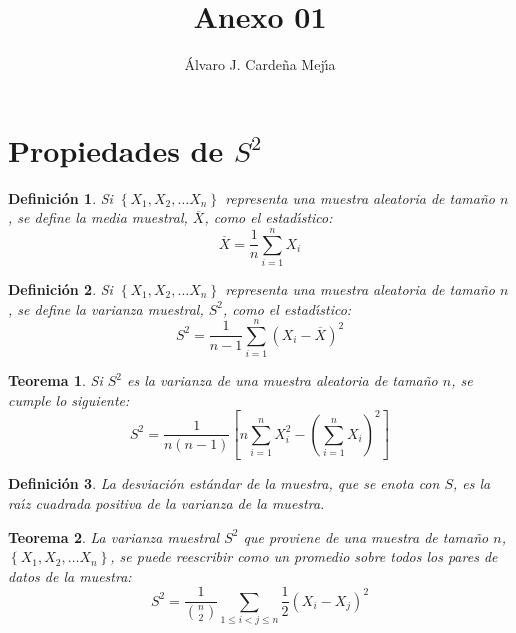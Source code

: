 \documentclass[a4paper,11pt]{article}
\title{Anexo 01}
\author{\'Alvaro J. Carde\~na Mej\'{\i}a}
\theoremstyle{teoremas}
\newtheorem{teorema}{Teorema}[section]
\theoremstyle{ejemplos}
\theoremstyle{definiciones}
\theoremstyle{lemas}
\newtheorem*{definicion}{Definici\'on}
\begin{document}
\maketitle

\section{Propiedades de $S^2$}

\begin{definicion}
 Si $\left\{ X_1, X_2, \ldots X_n \right\}$ representa una muestra aleatoria de tama\~no $n$, se define la media muestral, $\overline{X}$, como el estad\'{\i}stico:
 \begin{equation}
  \overline{X} = \frac{1}{n}\sum_{i=1}^n X_i
 \end{equation}
\end{definicion}

\begin{definicion}
 Si $\left\{ X_1, X_2, \ldots X_n \right\}$ representa una muestra aleatoria de tama\~no $n$, se define la varianza muestral, $S^2$, como el estad\'{\i}stico:
 \begin{equation*}
  S^2 = \frac{1}{n-1} \sum_{i=1}^n \left( X_i - \overline{X} \right)^2
 \end{equation*}
\end{definicion}

\begin{teorema} \label{Teorema:VarMCalculoFacil}
 Si $S^2$ es la varianza de una muestra aleatoria de tama\~no $n$, se cumple lo siguiente:
 \begin{equation} \label{Eq:VarMFormulaFacil}
  S^2 = \frac{1}{n(n-1)} \left[ n\sum_{i=1}^n X_i^2 - \left( \sum_{i=1}^n X_i \right)^2 \right]
 \end{equation}
\end{teorema}

\begin{definicion}
 La desviaci\'on est\'andar de la muestra, que se enota con $S$, es la ra\'{\i}z cuadrada positiva de la varianza de la muestra.
\end{definicion}


\begin{teorema} \label{Teorema:VarMExpresion1}
 La varianza muestral $S^2$ que proviene de una muestra de tama\~no $n$, $\left\{ X_1, X_2, \ldots X_n \right\}$, se puede reescribir como un promedio sobre todos los pares de datos de la muestra:
 \begin{equation} \label{Eq:VarMExpresion1}
  S^{2} = \frac{1}{ \binom{n}{2} } \sum_{1\leq i < j \leq n} \frac{1}{2} \left( X_i - X_j \right)^2
 \end{equation}
\end{teorema}
\end{document}
